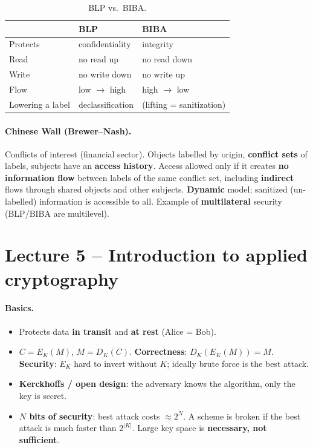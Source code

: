 \begin{table}[h]
\centering
\begin{tabular}{@{}lll@{}}
\toprule
 & \textbf{BLP} & \textbf{BIBA} \\
\midrule
Protects & confidentiality & integrity \\
Read & no read up & no read down \\
Write & no write down & no write up \\
Flow & low $\to$ high & high $\to$ low \\
Lowering a label & declassification & (lifting = sanitization) \\
\bottomrule
\end{tabular}
\caption{BLP vs.\ BIBA.}
\end{table}

\paragraph{Chinese Wall (Brewer--Nash).} Conflicts of interest (financial sector). Objects labelled by origin, \textbf{conflict sets} of labels, subjects have an \textbf{access history}. Access allowed only if it creates \textbf{no information flow} between labels of the same conflict set, including \textbf{indirect} flows through shared objects and other subjects. \textbf{Dynamic} model; sanitized (un-labelled) information is accessible to all. Example of \textbf{multilateral} security (BLP/BIBA are multilevel).

\section{Lecture 5 -- Introduction to applied cryptography}

\paragraph{Basics.}
\begin{itemize}
    \item Protects data \textbf{in transit} and \textbf{at rest} (Alice = Bob).
    \item $C = E_K(M)$, $M = D_K(C)$. \textbf{Correctness}: $D_K(E_K(M)) = M$. \textbf{Security}: $E_K$ hard to invert without $K$; ideally brute force is the best attack.
    \item \textbf{Kerckhoffs / open design}: the adversary knows the algorithm, only the key is secret.
    \item \textbf{$N$ bits of security}: best attack costs $\approx 2^N$. A scheme is broken if the best attack is much faster than $2^{|K|}$. Large key space is \textbf{necessary, not sufficient}.
\end{itemize}

